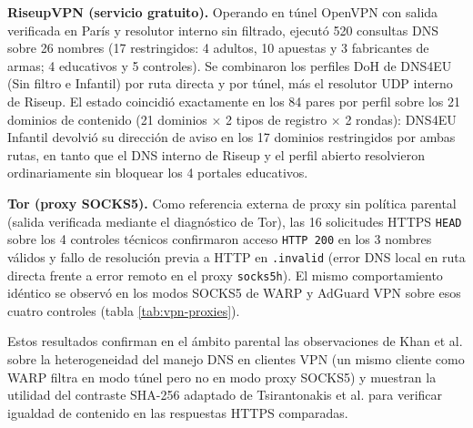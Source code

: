 \documentclass[10pt,a4paper]{article}
\begin{document}
\textbf{RiseupVPN (servicio gratuito).} Operando en túnel OpenVPN con salida verificada en París y resolutor interno sin filtrado, ejecutó 520 consultas DNS sobre 26 nombres (17 restringidos: 4 adultos, 10 apuestas y 3 fabricantes de armas; 4 educativos y 5 controles). Se combinaron los perfiles DoH de DNS4EU (Sin filtro e Infantil) por ruta directa y por túnel, más el resolutor UDP interno de Riseup. El estado coincidió exactamente en los 84 pares por perfil sobre los 21 dominios de contenido (21 dominios $\times$ 2 tipos de registro $\times$ 2 rondas): DNS4EU Infantil devolvió su dirección de aviso en los 17 dominios restringidos por ambas rutas, en tanto que el DNS interno de Riseup y el perfil abierto resolvieron ordinariamente sin bloquear los 4 portales educativos.

\textbf{Tor (proxy SOCKS5).} Como referencia externa de proxy sin política parental (salida verificada mediante el diagnóstico de Tor), las 16 solicitudes HTTPS \texttt{HEAD} sobre los 4 controles técnicos confirmaron acceso \texttt{HTTP 200} en los 3 nombres válidos y fallo de resolución previa a HTTP en \texttt{.invalid} (error DNS local en ruta directa frente a error remoto en el proxy \texttt{socks5h}). El mismo comportamiento idéntico se observó en los modos SOCKS5 de WARP y AdGuard VPN sobre esos cuatro controles (tabla \ref{tab:vpn-proxies}).

Estos resultados confirman en el ámbito parental las observaciones de Khan et al. \cite{khan2018vpn} sobre la heterogeneidad del manejo DNS en clientes VPN (un mismo cliente como WARP filtra en modo túnel pero no en modo proxy SOCKS5) y muestran la utilidad del contraste SHA-256 adaptado de Tsirantonakis et al. \cite{tsirantonakis2018proxy} para verificar igualdad de contenido en las respuestas HTTPS comparadas.
\end{document}
